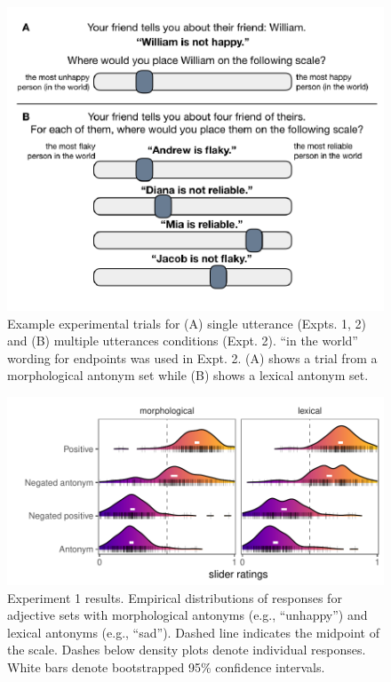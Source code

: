 \documentclass[floatsintext,doc]{apa6}
\begin{document}
\begin{figure}[hbt]

{\centering \includegraphics{figs/experiment-slides-1} 

}

\caption{Example experimental trials for (A) single utterance (Expts. 1, 2) and (B) multiple utterances conditions (Expt. 2). ``in the world'' wording for endpoints was used in Expt. 2. (A) shows a trial from a morphological antonym set while (B) shows a lexical antonym set.}\label{fig:experiment-slides}
\end{figure}

\begin{figure}[h]
\centering \includegraphics[width=0.95\linewidth]{figs/expt1_ridges_wCIs} 
\caption{Experiment 1 results. Empirical distributions of responses for adjective sets with morphological antonyms (e.g., ``unhappy'') and lexical antonyms (e.g., ``sad''). Dashed line indicates the midpoint of the scale. Dashes below density plots denote individual responses. White bars denote bootstrapped 95\% confidence intervals.}\label{fig:expt1-results}
\end{figure}
\end{document}
